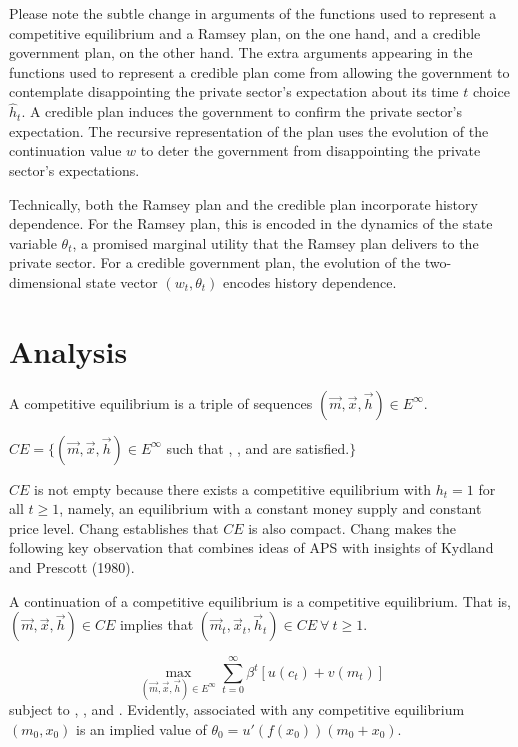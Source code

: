 Please note the subtle change in arguments of the functions used to represent  a competitive equilibrium and a  Ramsey plan, on the one hand,
and a credible government plan, on the other hand. The extra arguments appearing in the functions used to represent a credible plan
come from allowing the government to contemplate disappointing the private sector's expectation about its time $t$ choice $\hat h_t$. A credible plan induces
 the government to confirm the private sector's expectation.  The recursive representation of the plan uses
the evolution of the  continuation value $w$  to deter the government from disappointing the private sector's expectations.


Technically, both the Ramsey plan and the credible plan incorporate history dependence.  For the Ramsey plan, this is encoded in
the dynamics of the state variable $\theta_t$, a promised marginal utility that the Ramsey plan delivers to the private sector.
For a credible government plan, the evolution of the two-dimensional state vector $(w_t, \theta_t)$  encodes  history dependence.


\section{Analysis}

A competitive equilibrium  is a triple of sequences $(\vec m, \vec x, \vec h)  \in E^\infty$.

\medskip
{} $CE = \bigl\{ (\vec m, \vec x, \vec h) \in E^\infty $   such  that , ,   and  are satisfied.$\bigr\}$

\medskip
$CE$ is not empty because there exists a competitive equilibrium with $h_t =1 $ for all $t \geq 1$, namely,  an equilibrium with a constant money supply and
constant price level.  Chang establishes that $CE$ is also compact.
Chang makes the following key observation that combines ideas of  APS with insights of Kydland and Prescott (1980).

\medskip
{} A continuation of a competitive equilibrium is a competitive equilibrium. That is,
$(\vec m, \vec x, \vec h) \in CE$ implies that $(\vec m_t, \vec x_t, \vec h_t) \in CE \  \forall \ t \geq 1$.
\medskip

$$ \max_{(\vec m, \vec x, \vec h) \in E^\infty} \sum_{t=0}^\infty \beta^t \left[ u(c_t) + v(m_t) \right] $$
subject to ,   , and .
Evidently, associated with any competitive equilibrium $(m_0, x_0)$ is an implied value
of $\theta_0 = u'(f(x_0))(m_0 + x_0)$.
\medskip


